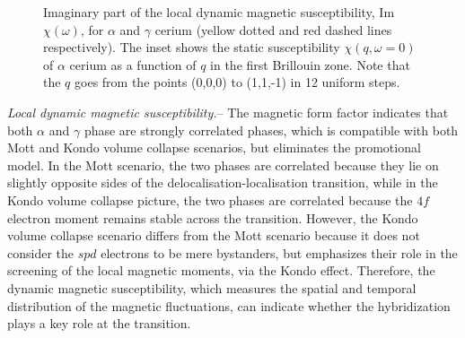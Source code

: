 \documentclass[10pt]{ruthesis}
\begin{document}
{%
\begin{figure}[!t]
\caption{
  Imaginary part of the local dynamic magnetic susceptibility,
  Im$\chi(\omega)$, for $\alpha$ and $\gamma$ cerium (yellow dotted and red dashed lines  respectively). The inset shows the static
  susceptibility $\chi(q, \omega=0)$ of $\alpha$ cerium as a function of $q$ in the first Brillouin zone. Note that
  the $q$ goes from the points (0,0,0) to (1,1,-1) in 12 uniform
  steps.
}
\label{Susc_both}
\end{figure}
%
{\it Local dynamic magnetic susceptibility.}-- The magnetic form factor
indicates that both $\alpha$ and $\gamma$ phase are strongly
correlated phases, which is compatible with both Mott and Kondo volume
collapse scenarios, but eliminates the promotional model.  In the Mott
scenario, the two phases are correlated because they lie on slightly
opposite sides of the delocalisation-localisation transition, while in
the Kondo volume collapse picture, the two phases are correlated
because the $4f$ electron moment remains stable across the transition.
However, the Kondo
volume collapse scenario differs from the Mott scenario because it
does not consider the $spd$ electrons to be mere bystanders, but
emphasizes their role in the screening of the local magnetic moments,
via the Kondo effect.  Therefore, the dynamic magnetic susceptibility,
which measures the spatial and temporal distribution of the magnetic
fluctuations, can indicate whether the hybridization plays a key role
at the transition.

}
\end{document}
